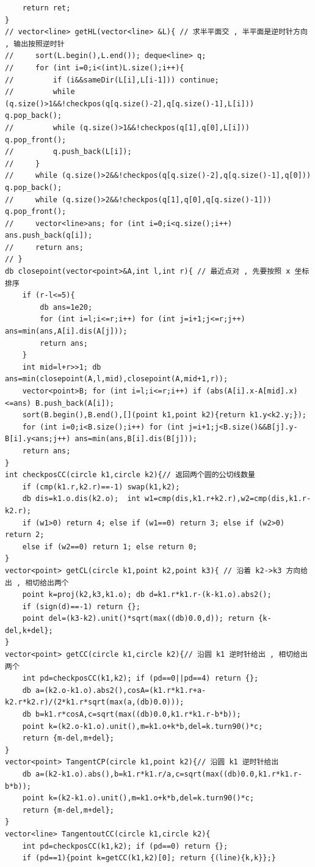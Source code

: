 \documentclass[twoside]{article}
\begin{document}
\begin{lstlisting}
    return ret;
}
// vector<line> getHL(vector<line> &L){ // 求半平面交 , 半平面是逆时针方向 , 输出按照逆时针
//     sort(L.begin(),L.end()); deque<line> q;
//     for (int i=0;i<(int)L.size();i++){
//         if (i&&sameDir(L[i],L[i-1])) continue;
//         while (q.size()>1&&!checkpos(q[q.size()-2],q[q.size()-1],L[i])) q.pop_back();
//         while (q.size()>1&&!checkpos(q[1],q[0],L[i])) q.pop_front();
//         q.push_back(L[i]);
//     }
//     while (q.size()>2&&!checkpos(q[q.size()-2],q[q.size()-1],q[0])) q.pop_back();
//     while (q.size()>2&&!checkpos(q[1],q[0],q[q.size()-1])) q.pop_front();
//     vector<line>ans; for (int i=0;i<q.size();i++) ans.push_back(q[i]);
//     return ans;
// }
db closepoint(vector<point>&A,int l,int r){ // 最近点对 , 先要按照 x 坐标排序 
    if (r-l<=5){
        db ans=1e20;
        for (int i=l;i<=r;i++) for (int j=i+1;j<=r;j++) ans=min(ans,A[i].dis(A[j]));
        return ans;
    }
    int mid=l+r>>1; db ans=min(closepoint(A,l,mid),closepoint(A,mid+1,r));
    vector<point>B; for (int i=l;i<=r;i++) if (abs(A[i].x-A[mid].x)<=ans) B.push_back(A[i]);
    sort(B.begin(),B.end(),[](point k1,point k2){return k1.y<k2.y;});
    for (int i=0;i<B.size();i++) for (int j=i+1;j<B.size()&&B[j].y-B[i].y<ans;j++) ans=min(ans,B[i].dis(B[j]));
    return ans;
}
int checkposCC(circle k1,circle k2){// 返回两个圆的公切线数量
    if (cmp(k1.r,k2.r)==-1) swap(k1,k2);
    db dis=k1.o.dis(k2.o);  int w1=cmp(dis,k1.r+k2.r),w2=cmp(dis,k1.r-k2.r);
    if (w1>0) return 4; else if (w1==0) return 3; else if (w2>0) return 2; 
    else if (w2==0) return 1; else return 0;
}
vector<point> getCL(circle k1,point k2,point k3){ // 沿着 k2->k3 方向给出 , 相切给出两个 
    point k=proj(k2,k3,k1.o); db d=k1.r*k1.r-(k-k1.o).abs2();
    if (sign(d)==-1) return {};
    point del=(k3-k2).unit()*sqrt(max((db)0.0,d)); return {k-del,k+del};
}
vector<point> getCC(circle k1,circle k2){// 沿圆 k1 逆时针给出 , 相切给出两个 
    int pd=checkposCC(k1,k2); if (pd==0||pd==4) return {};
    db a=(k2.o-k1.o).abs2(),cosA=(k1.r*k1.r+a-k2.r*k2.r)/(2*k1.r*sqrt(max(a,(db)0.0)));
    db b=k1.r*cosA,c=sqrt(max((db)0.0,k1.r*k1.r-b*b));
    point k=(k2.o-k1.o).unit(),m=k1.o+k*b,del=k.turn90()*c;
    return {m-del,m+del};
} 
vector<point> TangentCP(circle k1,point k2){// 沿圆 k1 逆时针给出 
    db a=(k2-k1.o).abs(),b=k1.r*k1.r/a,c=sqrt(max((db)0.0,k1.r*k1.r-b*b));
    point k=(k2-k1.o).unit(),m=k1.o+k*b,del=k.turn90()*c;
    return {m-del,m+del};
} 
vector<line> TangentoutCC(circle k1,circle k2){
    int pd=checkposCC(k1,k2); if (pd==0) return {}; 
    if (pd==1){point k=getCC(k1,k2)[0]; return {(line){k,k}};}

\end{lstlisting}
\end{document}
